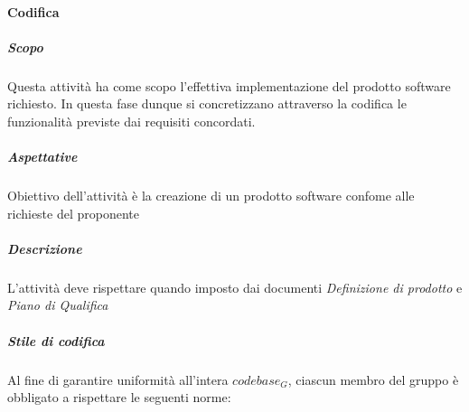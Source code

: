 		\paragraph{Codifica}
			\subparagraph{Scopo}
			Questa attività ha come scopo l'effettiva implementazione del prodotto software richiesto. In questa fase dunque si concretizzano attraverso la codifica le funzionalità previste dai requisiti concordati.
			\subparagraph{Aspettative}
			Obiettivo dell'attività è la creazione di un prodotto software confome alle richieste del proponente
			\subparagraph{Descrizione}
			L'attività deve rispettare quando imposto dai documenti \textit{Definizione di prodotto} e \textit{Piano di Qualifica}
			\subparagraph{Stile di codifica}
			Al fine di garantire uniformità all'intera $codebase_G$, ciascun membro del gruppo è obbligato a rispettare le seguenti norme:
